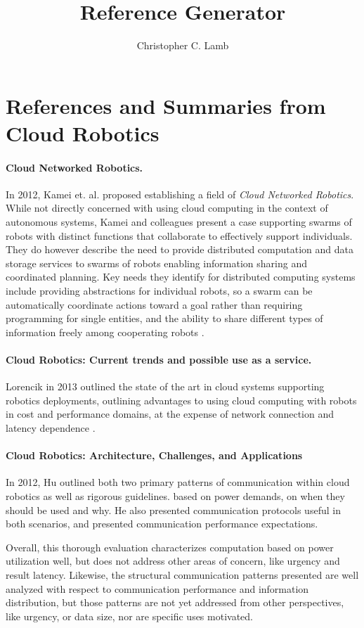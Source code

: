 \documentclass[10pt,letterpaper]{article}
\author{Christopher C. Lamb}
\title{Reference Generator}
\begin{document}
\section{References and Summaries from Cloud Robotics}

\paragraph{Cloud Networked Robotics.} In 2012, Kamei et. al. proposed establishing a field of {\sl Cloud Networked Robotics}.  While not directly concerned with using cloud computing in the context of autonomous systems, Kamei and colleagues present a case supporting swarms of robots with distinct functions that collaborate to effectively support individuals.  They do however describe the need to provide distributed computation and data storage services to swarms of robots enabling information sharing and coordinated planning.  Key needs they identify for distributed computing systems include providing abstractions for individual robots, so a swarm can be automatically coordinate actions toward a goal rather than requiring programming for single entities, and the ability to share different types of information freely among cooperating robots \cite{KaNiHaSa:12}.

\paragraph{Cloud Robotics: Current trends and possible use as a service.} Lorencik in 2013 outlined the state of the art in cloud systems supporting robotics deployments, outlining advantages to using cloud computing with robots in cost and performance domains, at the expense of network connection and latency dependence \cite{LoSi:13}.

\paragraph{Cloud Robotics: Architecture, Challenges, and Applications}
In 2012, Hu outlined both two primary patterns of communication within cloud robotics as well as rigorous guidelines. based on power demands, on when they should be used and why.  He also presented communication protocols useful in both scenarios, and presented communication performance expectations\cite{HuWeYo:12}.  

Overall, this thorough evaluation characterizes computation based on power utilization well, but does not address other areas of concern, like urgency and result latency.  Likewise, the structural communication patterns presented are well analyzed with respect to communication performance and information distribution, but those patterns are not yet addressed from other perspectives, like urgency, or data size, nor are specific uses motivated.
\end{document}
